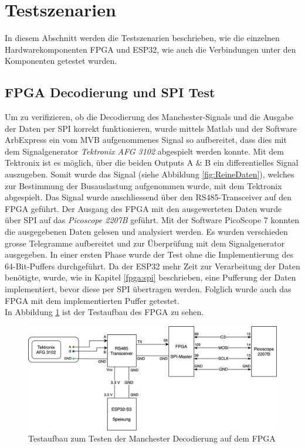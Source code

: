 \section{Testszenarien} %
\label{sec:Testszenarien}
In diesem Abschnitt werden die Testszenarien beschrieben, wie die einzelnen Hardwarekomponenten FPGA und ESP32, wie auch die Verbindungen unter den Komponenten getestet wurden.

\subsection{FPGA Decodierung und SPI Test}
\label{sub:FPGADecSPITest}
Um zu verifizieren, ob die Decodierung des Manchester-Signals und die Ausgabe der Daten per SPI korrekt funktionieren, wurde mittels Matlab und der Software ArbExpress ein vom MVB aufgenommenes Signal so aufbereitet, dass dies mit dem Signalgenerator \textit{Tektronix AFG 3102} abgespielt werden konnte. Mit dem Tektronix ist es möglich, über die beiden Outputs A \& B ein differentielles Signal auszugeben. Somit wurde das Signal (siehe Abbildung \ref{fig:ReineDaten}), welches zur Bestimmung der Busauslastung aufgenommen wurde, mit dem Tektronix abgespielt. Das Signal wurde anschliessend über den RS485-Transceiver auf den FPGA geführt. Der Ausgang des FPGA mit den ausgewerteten Daten wurde über SPI auf das \textit{Picoscope 2207B} geführt. Mit der Software PicoScope 7 konnten die ausgegebenen Daten gelesen und analysiert werden. Es wurden verschieden grosse Telegramme aufbereitet und zur Überprüfung mit dem Signalgenerator ausgegeben. In einer ersten Phase wurde der Test ohne die Implementierung des 64-Bit-Puffers durchgeführt. Da der ESP32 mehr Zeit zur Verarbeitung der Daten benötigte, wurde, wie in Kapitel \ref{fpga:spi} beschrieben, eine Pufferung der Daten implementiert, bevor diese per SPI übertragen werden. Folglich wurde auch das FPGA mit dem implementierten Puffer getestet.\\
In Abbildung \ref{fig:TestszenarioFPGA} ist der Testaufbau des FPGA zu sehen.

\begin{figure}[H]
    \centering
    \includegraphics[width=0.9\linewidth]{Figures/Chap3/Testszenarien/Testszenario_FPGA.png}
    \caption{Testaufbau zum Testen der Manchester Decodierung auf dem FPGA}
    \label{fig:TestszenarioFPGA}
\end{figure}

